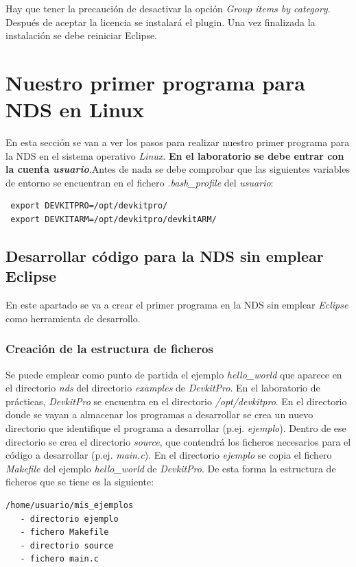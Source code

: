 Hay que tener la precaución de desactivar la opción \textit{Group items by category}. Después de aceptar la licencia se instalará el plugin. Una vez finalizada la instalación se debe reiniciar Eclipse.

\section{Nuestro primer programa para NDS en Linux}
En esta sección se van a ver los pasos para realizar nuestro primer programa para la NDS en el sistema operativo \textit{Linux}. \textbf{En el laboratorio se debe entrar con la cuenta \textit{usuario}}.Antes de nada se debe comprobar que las siguientes variables de entorno se encuentran en el fichero \textit{.bash\_profile} del \textit{usuario}:
\begin{verbatim}
 export DEVKITPRO=/opt/devkitpro/
 export DEVKITARM=/opt/devkitpro/devkitARM/
\end{verbatim}

\subsection{Desarrollar código para la NDS sin emplear Eclipse}
En este apartado se va a crear el primer programa en la NDS sin emplear \textit{Eclipse} como herramienta de desarrollo.

\subsubsection{Creación de la estructura de ficheros}
Se puede emplear como punto de partida el ejemplo  \textit{hello\_world} que aparece en el directorio \textit{nds} del directorio \textit{examples} de  \textit{DevkitPro}. En  el laboratorio de prácticas, \textit{DevkitPro} se encuentra en el directorio \textit{/opt/devkitpro}. En el directorio donde se vayan a almacenar los programas a desarro\-llar se crea un nuevo directorio que identifique el programa a desarrollar (p.ej. \textit{ejemplo}). Dentro de ese directorio se crea el directorio \textit{source}, que contendrá los ficheros necesarios para el código a desarrollar (p.ej. \textit{main.c}). En el directorio \textit{ejemplo} se copia el fichero \textit{Makefile} del  ejemplo  \textit{hello\_world} de \textit{DevkitPro}. De esta forma la estructura de ficheros que se tiene es la siguiente:
\begin{verbatim}
/home/usuario/mis_ejemplos
   - directorio ejemplo
   - fichero Makefile
   - directorio source
   - fichero main.c
\end{verbatim}

